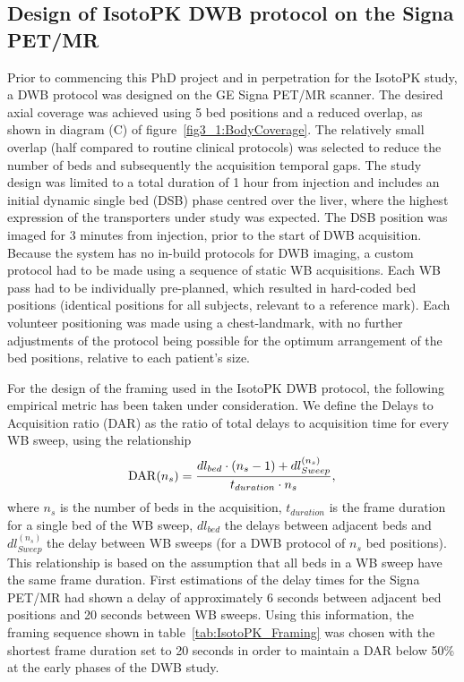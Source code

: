 \subsection{Design of IsotoPK DWB protocol on the Signa PET/MR}
Prior to commencing this PhD project and in perpetration for the IsotoPK study, a DWB protocol was designed on the GE Signa PET/MR scanner. The desired axial coverage was achieved using 5 bed positions and a reduced overlap, as shown in diagram (C) of figure~\ref{fig3_1:BodyCoverage}. The relatively small overlap (half compared to routine clinical protocols) was selected to reduce the number of beds and subsequently the acquisition temporal gaps.
The study design was limited to a total duration of 1 hour from injection and includes an initial dynamic single bed (DSB) phase centred over the liver, where the highest expression of the transporters under study was expected. 
The DSB position was imaged for 3 minutes from injection, prior to the start of DWB acquisition.
Because the system has no in-build protocols for DWB imaging, a custom protocol had to be made using a sequence of static WB acquisitions. Each WB pass had to be individually pre-planned, which resulted in hard-coded bed positions (identical positions for all subjects, relevant to a reference mark). Each volunteer positioning was made using a chest-landmark, with no further adjustments of the protocol being possible for the optimum arrangement of the bed positions, relative to each patient's size.

For the design of the framing used in the IsotoPK DWB protocol, the following empirical metric has been taken under consideration. We define the Delays to Acquisition ratio (DAR) as the ratio of total delays to acquisition time for every WB sweep, using the relationship
\begin{equation} \label{eqn:acq_to_dead_time}
 \mathrm{DAR}(n_s) = \frac{dl_{bed}\cdot (n_s-1) + dl_{Sweep}^{(n_s)}}{t_{duration}\cdot n_s }  \\ , \\ 
\end{equation}
where $n_s$ is the number of beds in the acquisition, $t_{duration}$ is the frame duration for a single bed of the WB sweep, $dl_{bed}$ the delays between adjacent beds and $dl_{Sweep}^{(n_s)}$ the delay between WB sweeps (for a DWB protocol of $n_s$ bed positions). This relationship is based on the assumption that all beds in a WB sweep have the same frame duration.
First estimations of the delay times for the Signa PET/MR had shown a delay of approximately 6 seconds between adjacent bed positions and 20 seconds between WB sweeps. Using this information, the framing sequence shown in table~\ref{tab:IsotoPK_Framing} was chosen with the shortest frame duration set to 20 seconds in order to maintain a DAR below 50\% at the early phases of the DWB study. 

